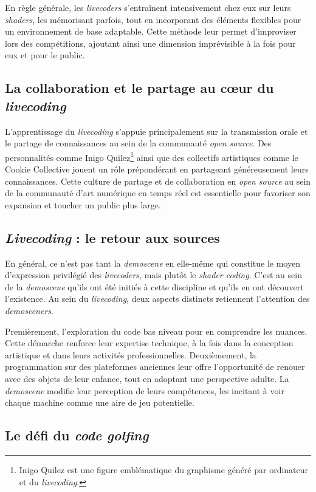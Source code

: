 En règle générale, les \textit{livecoders} s'entraînent intensivement chez eux sur leurs \textit{shaders}, les mémorisant parfois, tout en incorporant des éléments flexibles pour un environnement de base adaptable. Cette méthode leur permet d'improviser lors des compétitions, ajoutant ainsi une dimension imprévisible à la fois pour eux et pour le public.


\subsection*{La collaboration et le partage au cœur du \textit{livecoding}}

L'apprentissage du \textit{livecoding} s'appuie principalement sur la transmission orale et le partage de connaissances au sein de la communauté \textit{open source}. Des personnalités comme Inigo Quilez\footnote{Inigo Quilez est une figure emblématique du graphisme généré par ordinateur et du \textit{livecoding}.} ainsi que des collectifs artistiques comme le Cookie Collective jouent un rôle prépondérant en partageant généreusement leurs connaissances. Cette culture de partage et de collaboration en \textit{open source} au sein de la communauté d'art numérique en temps réel est essentielle pour favoriser son expansion et toucher un public plus large.

\subsection*{\textit{Livecoding} : le retour aux sources}
En général, ce n'est pas tant la \textit{demoscene} en elle-même qui constitue le moyen d'expression privilégié des \textit{livecoders}, mais plutôt le \textit{shader coding}. C'est au sein de la \textit{demoscene} qu'ils ont été initiés à cette discipline et qu'ils en ont découvert l'existence. Au sein du \textit{livecoding}, deux aspects distincts retiennent l'attention des \textit{demosceners}.

Premièrement, l'exploration du code bas niveau pour en comprendre les nuances. Cette démarche renforce leur expertise technique, à la fois dans la conception artistique et dans leurs activités professionnelles. Deuxièmement, la programmation sur des plateformes anciennes leur offre l'opportunité de renouer avec des objets de leur enfance, tout en adoptant une perspective adulte. La \textit{demoscene} modifie leur perception de leurs compétences, les incitant à voir chaque machine comme une aire de jeu potentielle.

\subsection*{Le défi du \textit{code golfing}}

